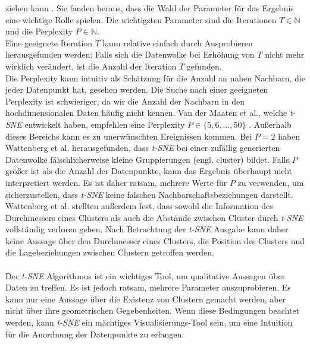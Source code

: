 \documentclass[12pt,letterpaper,ngerman]{article}
\begin{document}
ziehen kann \cite{wattenberg2016how}. 
Sie fanden heraus, dass die Wahl der Parameter 
für das Ergebnis eine wichtige Rolle spielen. Die wichtigsten 
Parameter sind die Iterationen $T\in \mathbb{N}$ und die Perplexity 
$P \in \mathbb{N}$.\\
Eine geeignete Iteration $T$ kann relative einfach durch 
Ausprobieren 
herausgefunden werden: Falls sich die Datenwolke bei Erhöhung
von $T$ nicht mehr wirklich verändert, ist die Anzahl der Iteration
$T$ gefunden. 
\pagebreak
\hfill\\
Die Perplexity kann intuitiv als Schätzung für die Anzahl an nahen 
Nachbarn, die jeder Datenpunkt hat, gesehen werden.
Die Suche nach einer geeigneten Perplexity ist schwieriger, 
da wir die Anzahl der Nachbarn in den hochdimensionalen 
Daten häufig nicht kennen. Van der Maaten et al., welche  
\textit{t-SNE} entwickelt haben,
empfehlen eine Perplexity $P \in \{5,6, \dots, 50\}$ 
\cite{JMLR:v9:vandermaaten08a}.
Außerhalb dieses Bereichs kann es zu unerwünschten Ereignissen 
kommen. Bei $P=2$ haben Wattenberg et al. herausgefunden, 
dass  \textit{t-SNE} bei einer zufällig generierten Datenwolke 
fälschlicherweise kleine Gruppierungen (engl. cluster) bildet. 
Falls $P$ größer ist als die Anzahl der Datenpunkte, kann das
Ergebnis überhaupt nicht interpretiert werden. Es ist daher ratsam,
mehrere Werte für $P$ zu verwenden, um sicherzustellen, 
dass  \textit{t-SNE} keine falschen Nachbarschaftsbeziehungen darstellt.\\
Wattenberg et al. stellten außerdem fest, dass sowohl die 
Information des Durchmessers eines Clusters als auch die Abstände 
zwischen Cluster durch  \textit{t-SNE}
vollständig  verloren gehen. Nach Betrachtung der  
\textit{t-SNE} Ausgabe kann daher 
keine Aussage über den Durchmesser eines Clusters, die Position 
des Clusters und die Lagebeziehungen zwischen Clustern getroffen 
werden.\\\\
Der  \textit{t-SNE} Algorithmus ist ein wichtiges Tool, um qualitative
Aussagen über Daten zu treffen. Es ist jedoch ratsam, mehrere 
Parameter auszuprobieren. Es kann nur eine Aussage über die 
Existenz von Clustern gemacht werden, aber nicht über ihre 
geometrischen 
Gegebenheiten. Wenn diese Bedingungen beachtet werden, kann  \textit{t-SNE}
ein mächtiges Visualisierungs-Tool sein, um eine Intuition für die
Anordnung der Datenpunkte zu erlangen.

\end{document}
